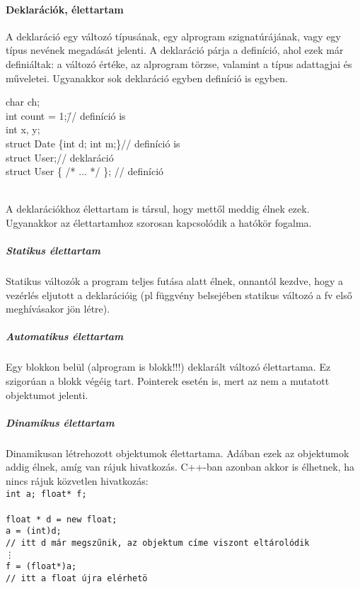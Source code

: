 \documentclass[fleqn,10pt,a4paper]{article}
\newcommand{\ut}[1]{\texttt{#1}}
\theoremstyle{magyar}
\begin{document}
  \paragraph{Deklarációk, élettartam}
  A deklaráció egy változó típusának, egy alprogram szignatúrájának,
  vagy egy típus nevének megadását jelenti. A deklaráció párja a
  definíció, ahol ezek már definiáltak: a változó értéke, az alprogram
  törzse, valamint a típus adattagjai és műveletei. Ugyanakkor sok
  deklaráció egyben definíció is egyben.\\
  \begin{tabbing}
    char ch;\\
    int count = 1;\qquad\qquad\qquad\= // definíció is\\
    int x, y;\\
    struct Date \{int d; int m;\}\>// definíció is\\
    struct User;\>// deklaráció\\
    struct User \{ /* ... */ \}; \>// definíció\\\\
  \end{tabbing}
  A deklarációkhoz élettartam is társul, hogy mettől meddig élnek
  ezek. Ugyanakkor az élettartamhoz szorosan kapcsolódik a hatókör fogalma.
  \subparagraph{Statikus élettartam}
  Statikus változók a program teljes futása alatt élnek, onnantól
  kezdve, hogy a vezérlés eljutott a deklarációig (pl függvény
  belsejében statikus változó a fv első meghívásakor jön létre).
  \subparagraph{Automatikus élettartam}
  Egy blokkon belül (alprogram is blokk!!!) deklarált változó
  élettartama. Ez szigorúan a blokk végéig tart. Pointerek esetén is,
  mert az nem a mutatott objektumot jelenti.
  \subparagraph{Dinamikus élettartam}
  Dinamikusan létrehozott objektumok élettartama. Adában ezek az objektumok
  addig élnek, amíg van rájuk hivatkozás. C++-ban azonban akkor is
  élhetnek, ha nincs rájuk közvetlen hivatkozás:\\
  \ut{int a; float* f;\\
    {\\
      float * d = new float;\\
      a = (int)d;\\
    }\quad // itt d már megszűnik, az objektum címe viszont eltárolódik\\ 
    \hspace*{.8em}\vdots\\
    f = (float*)a;\\
    // itt a float újra elérhetö\\
  }   
  
\end{document}

